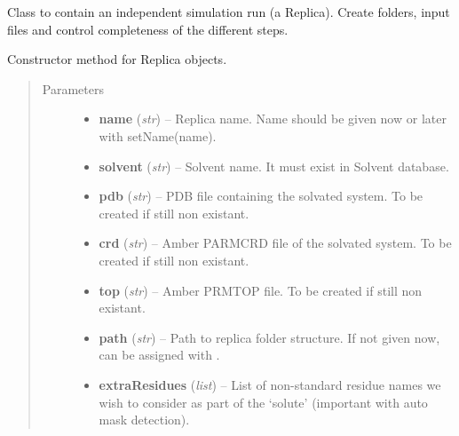 \documentclass[letterpaper,10pt,english]{sphinxmanual}
\begin{document}
\begin{fulllineitems}
\label{replicas:pyMDMix.Replicas.Replica}
Class to contain an independent simulation run (a Replica).
Create folders, input files and control completeness of the different steps.

\begin{fulllineitems}
\label{replicas:pyMDMix.Replicas.Replica.__init__}
Constructor method for Replica objects.
\begin{quote}\begin{description}
\item[{Parameters}] \leavevmode\begin{itemize}
\item {} 
\textbf{name} (\emph{str}) -- Replica name. Name should be given now or later with setName(name).

\item {} 
\textbf{solvent} (\emph{str}) -- Solvent name. It must exist in Solvent database.

\item {} 
\textbf{pdb} (\emph{str}) -- PDB file containing the solvated system. To be created if still non existant.

\item {} 
\textbf{crd} (\emph{str}) -- Amber PARMCRD file of the solvated system. To be created if still non existant.

\item {} 
\textbf{top} (\emph{str}) -- Amber PRMTOP file. To be created if still non existant.

\item {} 
\textbf{path} (\emph{str}) -- Path to replica folder structure. If not given now, can be assigned with {\hyperref[replicas:pyMDMix.Replicas.Replica.setPath]{}}.

\item {} 
\textbf{extraResidues} (\emph{list}) -- List of non-standard residue names we wish to consider as part of the `solute' (important with auto mask detection).


\end{itemize}
\end{description}
\end{quote}
\end{fulllineitems}
\end{fulllineitems}
\end{document}
